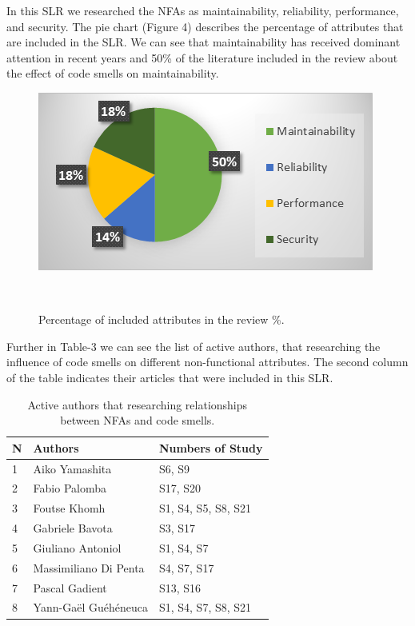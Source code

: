\documentclass{sigchi}
\begin{document}
In this SLR we researched the NFAs as maintainability, reliability, performance, and security. The pie chart (Figure 4) describes the percentage of attributes that are included in the SLR. We can see that maintainability has received dominant attention in recent years and 50\% of the literature included in the review about the effect of code smells on maintainability. 

\begin{figure}[h]
	\centering
	\includegraphics[width=1\columnwidth]{Figures/4}
	\caption{Percentage of included attributes in the review \%.}~\label{fig:figure1}
\end{figure}

Further in Table-3 we can see the list of active authors, that researching the influence of code smells on different non-functional attributes. The second column of the table indicates their articles that were included in this SLR.

\begin{table}[h]
	\small
	\begin{tabular}{ p{5mm} |  p{30mm} | p{30mm}}
		\toprule
		\textbf{N} & \textbf{Authors} & \textbf{Numbers of Study} \\
		\midrule
		1 & Aiko Yamashita  &  S6, S9 \\
		2 & Fabio Palomba  & S17, S20  \\
		3 & Foutse Khomh & S1, S4, S5, S8, S21 \\
		4 & Gabriele Bavota & S3, S17 \\
		5 & Giuliano Antoniol &S1, S4, S7  \\
		6 & Massimiliano Di Penta& S4, S7, S17 \\
		7 & Pascal Gadient & S13, S16 \\
		8 & Yann-Gaël Guéhéneuca& S1, S4, S7, S8, S21 \\
		\bottomrule
	\end{tabular}
	\caption{Active authors that researching relationships between NFAs and code smells.}~\label{tab:assess_criteria}
\end{table}
\end{document}
